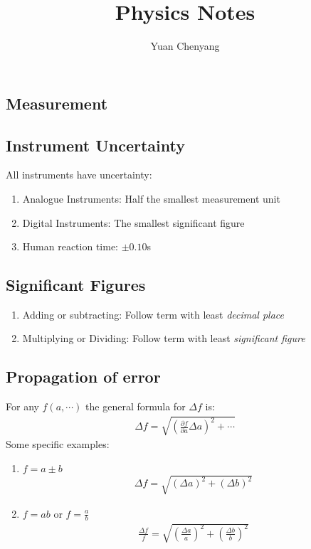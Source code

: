 \documentclass[11pt]{article}
\title{Physics Notes}
\author{Yuan Chenyang}
\makeatletter
\renewcommand\tableofcontents{%
    \@starttoc{toc}%
}
\makeatother
\begin{document}
\maketitle
\begin{multicols}{2}
\tableofcontents
\end{multicols}
\newpage

\begin{multicols*}{3}
\section{Measurement}
\subsection{Instrument Uncertainty}
All instruments have uncertainty:
\begin{enumerate}
\item Analogue Instruments: Half the smallest measurement unit
\item Digital Instruments: The smallest significant figure
\item Human reaction time: $\pm 0.10$s
\end{enumerate}
\subsection{Significant Figures}
\begin{enumerate}
\item Adding or subtracting: Follow term with least {\em decimal place}
\item Multiplying or Dividing: Follow term with least {\em significant figure}
\end{enumerate}
\subsection{Propagation of error}
For any $f(a, \cdots)$ the general formula for $\Delta f$ is:
	\begin{align*}
	\Delta f = \sqrt{\left( \frac{\partial f}{\partial a} \Delta a \right)^2 + \cdots}
	\end{align*}
Some specific examples:
\begin{enumerate}
\item $f=a\pm b$
	\begin{align*}
	\Delta f = \sqrt{(\Delta a)^2+(\Delta b)^2}
	\end{align*}
\item $f=ab$ or $f=\frac{a}{b}$
	\begin{align*}
	\frac{\Delta f}{f} = \sqrt{\left(\frac{\Delta a}{a} \right)^2+\left(\frac{\Delta b}{b} \right)^2}
	\end{align*}
\end{enumerate}

\end{multicols*}
\end{document}
